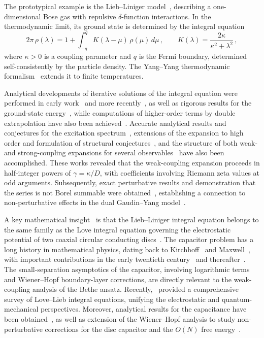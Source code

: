 \documentclass[11pt,a4paper]{article}
\theoremstyle{definition}
\begin{document}
The prototypical example is the Lieb--Liniger model~\cite{LiebLiniger1963,Lieb1963},
describing a one-dimensional Bose gas with repulsive $\delta$-function interactions.
In the thermodynamic limit, its ground state is determined by the integral equation
\begin{equation}\label{eq.LL}
  2\pi\,\rho(\lambda)= 1 + \int_{-q}^{q} K(\lambda -\mu)\,\rho(\mu)\,d\mu\,,
  \qquad K(\lambda) = \frac{2\kappa}{\kappa^2+\lambda^2}\,,
\end{equation}
where $\kappa>0$ is a coupling parameter and $q$ is the Fermi boundary, determined
self-consistently by the particle density.
The Yang--Yang thermodynamic formalism~\cite{YangYang1969} extends it to finite
temperatures.   



Analytical developments of iterative solutions of the integral equation were performed in early 
work~\cite{Popov1977} and more recently~\cite{KaminakaWadati2011}, as well as rigorous results for the ground-state
energy~\cite{TracyWidom2016}, while computations of higher-order terms by double
extrapolation have also been achieved~\cite{Prolhac2017}. 
Accurate analytical results and conjectures for the excitation spectrum~\cite{LangHekkingMinguzzi2017}, extensions of the expansion to high order 
and formulation of structural conjectures~\cite{Ristivojevic2014,Ristivojevic2019}, and the structure of both weak- and strong-coupling expansions
for several observables~\cite{Lang2019} have also been accomplished.
These works revealed that the weak-coupling expansion proceeds in half-integer powers
of $\gamma=\kappa/D$, with coefficients involving Riemann zeta values at odd arguments.
Subsequently, exact perturbative
results and demonstration that the series is not Borel summable were obtained~\cite{MarinoReis2019}, establishing a
connection to non-perturbative effects in the dual Gaudin--Yang
model~\cite{Yang1967,Gaudin1967}.

A key mathematical insight~\cite{Gaudin1971} is that the
Lieb--Liniger integral equation belongs to the same family as the Love integral equation
governing the electrostatic potential of two coaxial circular conducting
discs~\cite{Love1949}.
The capacitor problem has a long history in mathematical physics, dating back to
Kirchhoff~\cite{Kirchhoff1877} and Maxwell~\cite{Maxwell1873}, with important
contributions in the early twentieth century~\cite{Nicholson1924,Ignatowsky1932} and thereafter~\cite{Cooke1958,Hutson1963,Sneddon1966}.
The small-separation asymptotics of the capacitor, involving logarithmic terms and
Wiener--Hopf boundary-layer corrections, are directly relevant to the weak-coupling
analysis of the Bethe ansatz.
Recently,~\cite{FarinaLangMartin2022} provided a
comprehensive survey of Love--Lieb integral equations, unifying the electrostatic and
quantum-mechanical perspectives. Moreover, analytical results for the capacitance have been obtained~\cite{ReichertRistivojevic2020}, as well as extension of the Wiener--Hopf analysis to
study non-perturbative corrections for the disc capacitor and the $O(N)$ free energy~\cite{BajnokBalogHegedusVona2022}. 
\end{document}
